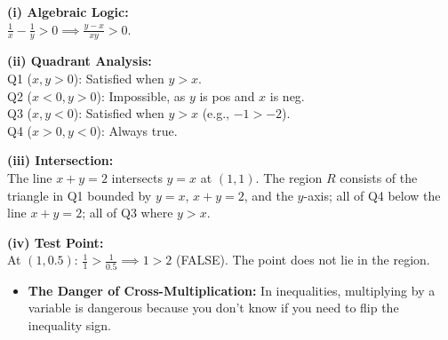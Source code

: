 \begin{solution}
\textbf{(i) Algebraic Logic:}\\
$\frac{1}{x} - \frac{1}{y} > 0 \implies \frac{y-x}{xy} > 0$.

\textbf{(ii) Quadrant Analysis:}\\
Q1 ($x,y > 0$): Satisfied when $y > x$.\\
Q2 ($x < 0, y > 0$): Impossible, as $y$ is pos and $x$ is neg.\\
Q3 ($x,y < 0$): Satisfied when $y > x$ (e.g., $-1 > -2$).\\
Q4 ($x > 0, y < 0$): Always true.

\textbf{(iii) Intersection:}\\
The line $x+y=2$ intersects $y=x$ at $(1, 1)$. The region $R$ consists of the triangle in Q1 bounded by $y=x$, $x+y=2$, and the $y$-axis; all of Q4 below the line $x+y=2$; all of Q3 where $y > x$.

\textbf{(iv) Test Point:}\\
At $(1, 0.5)$: $\frac{1}{1} > \frac{1}{0.5} \implies 1 > 2$ (FALSE). The point does not lie in the region.
\end{solution}

\begin{takeaways}
\begin{itemize}[leftmargin=*]
\item \textbf{The Danger of Cross-Multiplication:} In inequalities, multiplying by a variable is dangerous because you don't know if you need to flip the inequality sign.
\end{itemize}
\end{takeaways}

